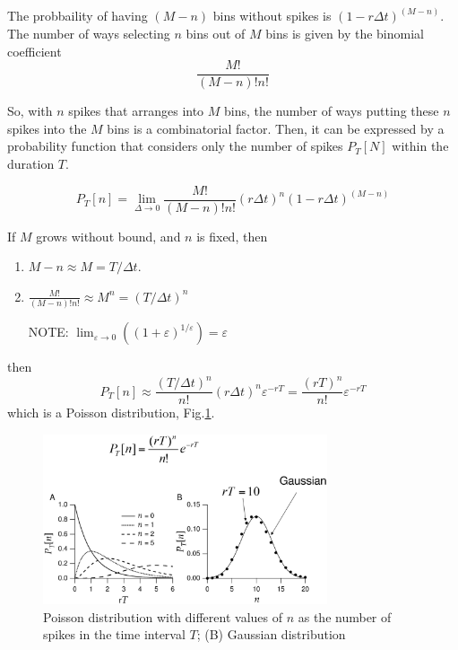 The probbaility of having $(M-n)$ bins without spikes is 
$(1-r\Delta t)^{(M-n)}$. The number of ways selecting $n$ bins out of $M$ bins
is given by the binomial coefficient
\begin{equation}
\frac{M!}{(M-n)! n!}
\end{equation}

So, with $n$ spikes that arranges into $M$ bins, the number of ways putting
these $n$ spikes into the $M$ bins is a combinatorial factor.
Then, it can be expressed by a probability function that considers only the
number of spikes $P_T[N]$ within the duration $T$.


\begin{equation}
P_T[n] = \lim_{\Delta \rightarrow 0} \frac{M!}{(M-n)! n!}
\left( r\Delta t\right)^n \left( 1-r\Delta t\right)^{(M-n)}
\end{equation} 

If $M$ grows without bound, and $n$ is fixed, then 
\begin{enumerate}
  \item  $M-n \approx M = T/\Delta t$.

  \item $\frac{M!}{(M-n)! n!}  \approx M^n = (T/\Delta t)^n$

NOTE: $\lim_{\varepsilon \rightarrow 0 } \left( (1+\varepsilon)^{1/\varepsilon}\right) = \varepsilon$

\end{enumerate}
then
\begin{equation}
P_T[n] \approx \frac{(T/\Delta t)^n}{n!} (r\Delta t)^n \varepsilon^{-rT} 
  = \frac{(rT)^n}{n!} \varepsilon^{-rT}
\end{equation}
which is a Poisson distribution, Fig.\ref{fig:Poisson_distribution}.


% 
% 


\begin{figure}[hbt]
  \centerline{\includegraphics[height=5cm,
    angle=0]{./images/Poisson_distribution.eps}}
  \caption{Poisson distribution with different values of $n$ as the number of
  spikes in the time interval $T$; (B) Gaussian distribution}
  \label{fig:Poisson_distribution}
\end{figure}

